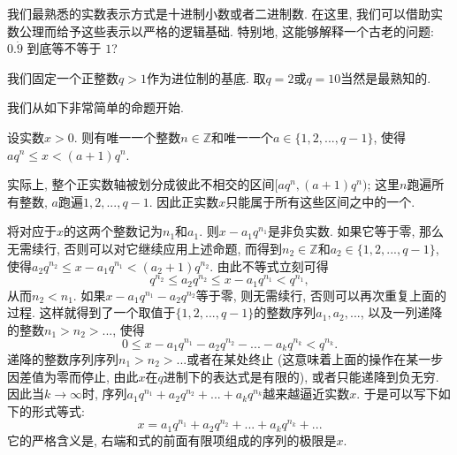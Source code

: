 

我们最熟悉的实数表示方式是十进制小数或者二进制数. 在这里, 我们可以借助实数公理而给予这些表示以严格的逻辑基础. 特别地, 这能够解释一个古老的问题: $0.\dot{9}$ 到底等不等于 $1$?

我们固定一个正整数$q>1$作为进位制的基底. 取$q=2$或$q=10$当然是最熟知的.

我们从如下非常简单的命题开始. 
\begin{lemma}{}
设实数$x>0$. 则有唯一一个整数$n\in\mathbb{Z}$和唯一一个$a\in\{1,2,...,q-1\}$, 使得$aq^n\leq x<(a+1)q^{n}$.
\end{lemma}

实际上, 整个正实数轴被划分成彼此不相交的区间$[aq^n,(a+1)q^{n})$; 这里$n$跑遍所有整数, $a$跑遍$1,2,...,q-1$. 因此正实数$x$只能属于所有这些区间之中的一个. 

将对应于$x$的这两个整数记为$n_1$和$a_1$. 则$x-a_1q^{n_1}$是非负实数. 如果它等于零, 那么无需续行, 否则可以对它继续应用上述命题, 而得到$n_2\in\mathbb{Z}$和$a_2\in\{1,2,...,q-1\}$, 使得$a_2q^{n_2}\leq x-a_1q^{n_1}<(a_2+1)q^{n_2}$. 由此不等式立刻可得
\[
q^{n_2}\leq a_2q^{n_2}\leq x-a_1q^{n_1}<q^{n_1},
\]
从而$n_2<n_1$. 如果$x-a_1q^{n_1}-a_2q^{n_2}$等于零, 则无需续行, 否则可以再次重复上面的过程. 这样就得到了一个取值于$\{1,2,...,q-1\}$的整数序列$a_1,a_2,...$, 以及一列递降的整数$n_1>n_2>...$, 使得
\[ 
0\leq x-a_1q^{n_1}-a_2q^{n_2}-...-a_kq^{n_k}<q^{n_k}.
\]
递降的整数序列序列$n_1>n_2>...$或者在某处终止 (这意味着上面的操作在某一步因差值为零而停止, 由此$x$在$q$进制下的表达式是有限的), 或者只能递降到负无穷. 因此当$k\to\infty$时, 序列$a_1q^{n_1}+a_2q^{n_2}+...+a_kq^{n_k}$越来越逼近实数$x$. 于是可以写下如下的形式等式:
\[
x=a_1q^{n_1}+a_2q^{n_2}+...+a_kq^{n_k}+...
\]
它的严格含义是, 右端和式的前面有限项组成的序列的极限是$x$.